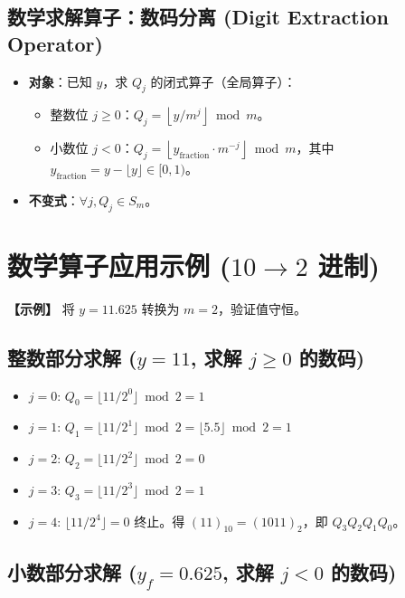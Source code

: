 \subsection{数学求解算子：数码分离 (Digit Extraction Operator)}

\begin{itemize}
    \item \textbf{对象}：已知 $y$，求 $Q_j$ 的闭式算子（全局算子）：
    \begin{itemize}
        \item 整数位 $j \ge 0$：$Q_j = \left\lfloor y / m^j \right\rfloor \bmod m$。
        \item 小数位 $j < 0$：$Q_j = \left\lfloor y_{\text{fraction}} \cdot m^{-j} \right\rfloor \bmod m$，其中 $y_{\text{fraction}} = y - \lfloor y \rfloor \in [0,1)$。
    \end{itemize}
    \item \textbf{不变式}：$\forall j, Q_j \in S_m$。
\end{itemize}

\section{\texorpdfstring{数学算子应用示例 ($10 \to 2$ 进制)}{数学算子应用示例 (10 转 2 进制)}}

\textbf{【示例】} 将 $y = 11.625$ 转换为 $m=2$，验证值守恒。

\subsection{\texorpdfstring{整数部分求解 ($y = 11$, 求解 $j \geq 0$ 的数码)}{(1) 整数部分求解 (y = 11, 求解 j >= 0 的数码)}}

\begin{itemize}
    \item $j=0$: $Q_0 = \lfloor 11/2^0 \rfloor \bmod 2 = 1$
    \item $j=1$: $Q_1 = \lfloor 11/2^1 \rfloor \bmod 2 = \lfloor 5.5 \rfloor \bmod 2 = 1$
    \item $j=2$: $Q_2 = \lfloor 11/2^2 \rfloor \bmod 2 = 0$
    \item $j=3$: $Q_3 = \lfloor 11/2^3 \rfloor \bmod 2 = 1$
    \item $j=4$: $\lfloor 11/2^4 \rfloor = 0$ 终止。得 $(11)_{10} = (1011)_2$，即 $Q_3Q_2Q_1Q_0$。
\end{itemize}

\subsection{\texorpdfstring{小数部分求解 ($y_f = 0.625$, 求解 $j < 0$ 的数码)}{(2) 小数部分求解 (yf = 0.625, 求解 j < 0 的数码)}}

